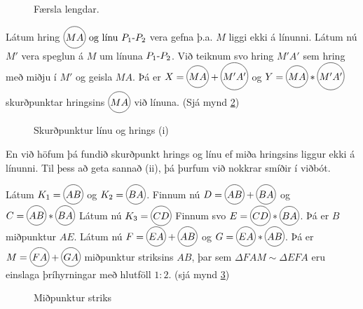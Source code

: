 \begin{frame}
  \begin{figure}[H]
    \centering
    \ifglaerur
    
    \else
    
    \fi
    \caption{Færsla lengdar.}
    \label{fig:CET}
  \end{figure}
\end{frame}
\begin{frame}
  \begin{hfsmid}
    \label{hfsmid:skpomidjulinuoghrings}
    Látum hring \(\hri{MA} \Og \text{línu } \lin{P_1}{P_2}\)
    vera gefna þ.a.  \(M\) liggi ekki á línunni.
    Látum nú \(M'\) vera speglun á \(M\) um línuna \(\lin{P_1}{P_2}\).
    Við teiknum svo hring \(M'A'\) sem hring með miðju í \(M'\)
    og geisla \(MA\).
    Þá er \( X = \hri{MA} + \hri{M'A'} \) og \(Y = \hri{MA}*\hri{M'A'}\)
    skurðpunktar hringsins \(\hri{MA}\) við línuna.
    (Sjá mynd \ref{fig:mmcon1})
  \end{hfsmid}
\end{frame}

\begin{frame}
  \begin{figure}[H]
    \centering
    \ifglaerur
    
    \else
    
    \fi
    \caption{Skurðpunktur línu og hrings (i)}
    \label{fig:mmcon1}
  \end{figure}
  En við höfum þá fundið skurðpunkt hrings og línu ef miða hringsins liggur
  ekki á línunni.
  Til þess að geta sannað (ii), þá þurfum við nokkrar smíðir í viðbót.
\end{frame}

\begin{frame}
  \begin{hfsmid} \label{hfsmid:midplinu}
    Látum \(K_1 = \hri{AB}\) og \(K_2 = \hri{BA}\).
    Finnum nú
    \(D = \hri{AB}+\hri{BA}\)
    og
    \(C = \hri{AB}*\hri{BA}\)
    Látum nú \(K_3 = \hri{CD}\)
    Finnum svo \(E = \hri{CD}*\hri{BA}\). Þá er \(B\) miðpunktur \(AE\).
    Látum nú
    \(F = \hri{EA}+\hri{AB} \) og
    \(G = \hri{EA}*\hri{AB} \).
    Þá er \(M = \hri{FA}+\hri{GA}\) miðpunktur striksins \(AB\),
    þar sem \(\Delta FAM \sim \Delta EFA\) eru einslaga þríhyrningar með
    hlutföll \(1:2\).
   (sjá mynd \ref{fig:mmcon2}) 
  \end{hfsmid}
\end{frame}
\begin{frame}
  \begin{figure}[H]
    \centering
    \ifglaerur
    
    \else
    
    \fi
    \caption{Miðpunktur striks}
    \label{fig:mmcon2}
  \end{figure}
\end{frame}


